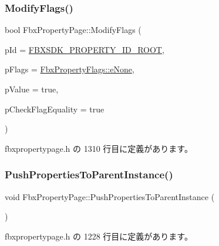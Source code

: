 \subsubsection{\texorpdfstring{Modify\+Flags()}{ModifyFlags()}}
{\footnotesize\ttfamily bool Fbx\+Property\+Page\+::\+Modify\+Flags (\begin{DoxyParamCaption}\item[{\hyperlink{fbxtypes_8h_a088fa96de3b0b3ea69f0f6afef525dfb}{Fbx\+Int}}]{p\+Id = {\ttfamily \hyperlink{fbxpropertydef_8h_a291bdb6d8428dce8463143fa3aba2c34}{F\+B\+X\+S\+D\+K\+\_\+\+P\+R\+O\+P\+E\+R\+T\+Y\+\_\+\+I\+D\+\_\+\+R\+O\+OT}},  }\item[{\hyperlink{class_fbx_property_flags_afabfa7e0949aac8a7dcdf8a141867e99}{Fbx\+Property\+Flags\+::\+E\+Flags}}]{p\+Flags = {\ttfamily \hyperlink{class_fbx_property_flags_afabfa7e0949aac8a7dcdf8a141867e99ac1b9aab93d40af76eb419be426de17b1}{Fbx\+Property\+Flags\+::e\+None}},  }\item[{bool}]{p\+Value = {\ttfamily true},  }\item[{bool}]{p\+Check\+Flag\+Equality = {\ttfamily true} }\end{DoxyParamCaption})\hspace{0.3cm}{\ttfamily [inline]}}



 fbxpropertypage.\+h の 1310 行目に定義があります。

\mbox{\label{class_fbx_property_page_a37f8a46ebab50d047b190e9195af33a4}} 
\subsubsection{\texorpdfstring{Push\+Properties\+To\+Parent\+Instance()}{PushPropertiesToParentInstance()}}
{\footnotesize\ttfamily void Fbx\+Property\+Page\+::\+Push\+Properties\+To\+Parent\+Instance (\begin{DoxyParamCaption}{ }\end{DoxyParamCaption})\hspace{0.3cm}{\ttfamily [inline]}}



 fbxpropertypage.\+h の 1228 行目に定義があります。

